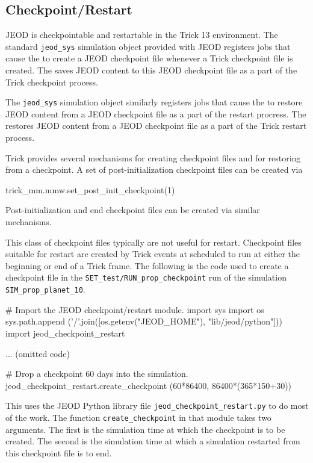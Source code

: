 \subsection{Checkpoint/Restart}
JEOD is checkpointable and restartable in the Trick 13 environment.
The standard \verb|jeod_sys| simulation object provided with JEOD
registers jobs that cause the \ModelDesc to create a JEOD checkpoint file
whenever a Trick checkpoint file is created.
The \ModelDesc saves JEOD content to this JEOD checkpoint file as a part of
the Trick checkpoint process.

The  \verb|jeod_sys| simulation object
similarly registers jobs that cause the \ModelDesc to restore JEOD content
from a JEOD checkpoint file as a part of the restart procress.
The \ModelDesc restores JEOD content from a JEOD checkpoint file as a part of
the Trick restart process.

Trick provides several mechanisms for creating checkpoint files and
for restoring from a checkpoint.
A set of post-initialization checkpoint files can be created via
\begin{codeblock}
trick_mm.mmw.set_post_init_checkpoint(1)
\end{codeblock}
Post-initialization and end checkpoint files can be created via similar
mechanisms.

This class of checkpoint files typically are not useful for restart.
Checkpoint files suitable for restart are created by Trick events
at scheduled to run at either the beginning or end of a Trick frame.
The following is the code used to create a checkpoint file in the
\verb|SET_test/RUN_prop_checkpoint| run
of the
 simulation \verb|SIM_prop_planet_10|.
\begin{codeblock}
# Import the JEOD checkpoint/restart module.
import sys
import os
sys.path.append ('/'.join([os.getenv("JEOD_HOME"), "lib/jeod/python"]))
import jeod_checkpoint_restart

... (omitted code)

# Drop a checkpoint 60 days into the simulation.
jeod_checkpoint_restart.create_checkpoint (60*86400, 86400*(365*150+30))
\end{codeblock}

This uses the JEOD Python library file \verb|jeod_checkpoint_restart.py|
to do most of the work. The function \verb|create_checkpoint| in that
module takes two arguments. The first is the simulation time at which the
checkpoint is to be created. The second is the simulation time at which
a simulation restarted from this checkpoint file is to end.


